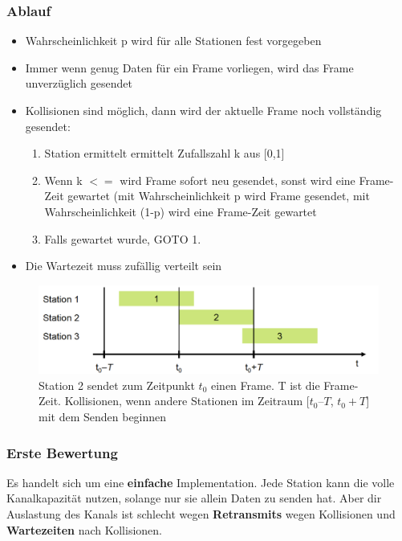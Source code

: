\documentclass{article} %
\begin{document}
\subsubsection{Ablauf}
	\begin{itemize}
	\item Wahrscheinlichkeit p wird für alle Stationen fest vorgegeben 
	\item Immer wenn genug Daten für ein Frame vorliegen, wird das Frame unverzüglich gesendet 
	\item Kollisionen sind möglich, dann wird der aktuelle Frame noch vollständig gesendet:
		\begin{enumerate}
		\item Station ermittelt ermittelt Zufallszahl k aus [0,1]
		\item Wenn k $<=$ wird Frame sofort neu gesendet, sonst wird eine Frame-Zeit gewartet (mit Wahrscheinlichkeit p wird Frame gesendet, mit Wahrscheinlichkeit (1-p) wird eine Frame-Zeit gewartet 
		\item Falls gewartet wurde, GOTO 1. 
		\end{enumerate}
	\item Die Wartezeit muss zufällig verteilt sein 
	\end{itemize}	

\begin{figure}[ht]
	\centering
  \includegraphics[width=12cm]{img/pure1.png}
	\caption{Station 2 sendet zum Zeitpunkt $t_0$  einen Frame. T ist die Frame-Zeit. Kollisionen, wenn andere Stationen im Zeitraum [$t_0–T$, $t_0+T$] mit dem Senden beginnen}
\end{figure}

\subsubsection{Erste Bewertung}
Es handelt sich um eine \textbf{einfache} Implementation. Jede Station kann die volle Kanalkapazität nutzen, solange nur sie allein Daten zu senden hat. Aber dir Auslastung des Kanals ist schlecht wegen \textbf{Retransmits} wegen Kollisionen und \textbf{Wartezeiten} nach Kollisionen.
\end{document}
